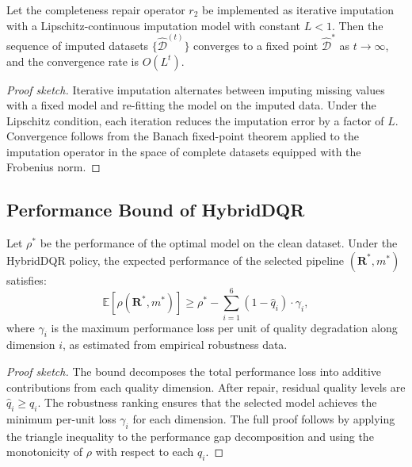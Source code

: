 \documentclass[runningheads]{llncs}
\begin{document}
\begin{proposition}
Let the completeness repair operator $r_2$ be implemented as
iterative imputation with a Lipschitz-continuous imputation model
with constant $L < 1$.
Then the sequence of imputed datasets $\{\hat{\mathcal{D}}^{(t)}\}$
converges to a fixed point $\hat{\mathcal{D}}^*$ as $t \to \infty$,
and the convergence rate is $O(L^t)$.
\end{proposition}

\begin{proof}[Proof sketch]
Iterative imputation alternates between imputing missing values with
a fixed model and re-fitting the model on the imputed data.
Under the Lipschitz condition, each iteration reduces the imputation
error by a factor of $L$.
Convergence follows from the Banach fixed-point theorem applied to
the imputation operator in the space of complete datasets equipped
with the Frobenius norm.
\end{proof}

\subsection{Performance Bound of HybridDQR}

\begin{theorem}
\label{thm:bound}
Let $\rho^*$ be the performance of the optimal model on the clean
dataset.
Under the HybridDQR policy, the expected performance of the selected
pipeline $(\mathbf{R}^*, m^*)$ satisfies:
\begin{equation}
  \mathbb{E}[\rho(\mathbf{R}^*, m^*)] \geq
  \rho^* - \sum_{i=1}^{6} (1 - \hat{q}_i) \cdot \gamma_i,
\end{equation}
where $\gamma_i$ is the maximum performance loss per unit of
quality degradation along dimension $i$, as estimated from
empirical robustness data.
\end{theorem}

\begin{proof}[Proof sketch]
The bound decomposes the total performance loss into additive
contributions from each quality dimension.
After repair, residual quality levels are $\hat{q}_i \geq q_i$.
The robustness ranking ensures that the selected model achieves
the minimum per-unit loss $\gamma_i$ for each dimension.
The full proof follows by applying the triangle inequality to the
performance gap decomposition and using the monotonicity of $\rho$
with respect to each $q_i$.
\end{proof}
\end{document}
